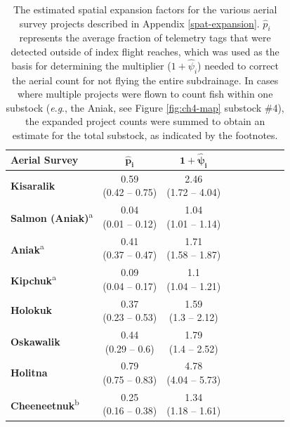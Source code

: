 \documentclass[12pt,]{book}
\theoremstyle{definition}
\theoremstyle{definition}
\theoremstyle{definition}
\theoremstyle{remark}
\begin{document}
\begin{table}

\caption{\label{tab:spat-expand-table}The estimated spatial expansion factors for the various aerial survey projects described in Appendix \ref{spat-expansion}. $\hat{p}_i$ represents the average fraction of telemetry tags that were detected outside of index flight reaches, which was used as the basis for determining the multiplier ($1 + \hat{\psi}_i$) needed to correct the aerial count for not flying the entire subdrainage. In cases where multiple projects were flown to count fish within one substock (\textit{e}.\textit{g}., the Aniak, see Figure \ref{fig:ch4-map} substock \#4), the expanded project counts were summed to obtain an estimate for the total substock, as indicated by the footnotes.}
\centering
\begin{tabular}[t]{lcclcclcc}
\toprule
\textbf{Aerial Survey} & $\boldsymbol{\hat{p}_i}$ & $\boldsymbol{1 + \hat{\psi}_i}$\\
\midrule
\textbf{Kisaralik} & \makecell[c]{0.59\\(0.42 -- 0.75)} & \makecell[c]{2.46\\(1.72 -- 4.04)}\\
\textbf{Salmon (Aniak)}\textsuperscript{a} & \makecell[c]{0.04\\(0.01 -- 0.12)} & \makecell[c]{1.04\\(1.01 -- 1.14)}\\
\textbf{Aniak}\textsuperscript{a} & \makecell[c]{0.41\\(0.37 -- 0.47)} & \makecell[c]{1.71\\(1.58 -- 1.87)}\\
\textbf{Kipchuk}\textsuperscript{a} & \makecell[c]{0.09\\(0.04 -- 0.17)} & \makecell[c]{1.1\\(1.04 -- 1.21)}\\
\textbf{Holokuk} & \makecell[c]{0.37\\(0.23 -- 0.53)} & \makecell[c]{1.59\\(1.3 -- 2.12)}\\
\textbf{Oskawalik} & \makecell[c]{0.44\\(0.29 -- 0.6)} & \makecell[c]{1.79\\(1.4 -- 2.52)}\\
\textbf{Holitna} & \makecell[c]{0.79\\(0.75 -- 0.83)} & \makecell[c]{4.78\\(4.04 -- 5.73)}\\
\textbf{Cheeneetnuk}\textsuperscript{b} & \makecell[c]{0.25\\(0.16 -- 0.38)} & \makecell[c]{1.34\\(1.18 -- 1.61)}\\

\end{tabular}
\end{table}
\end{document}
